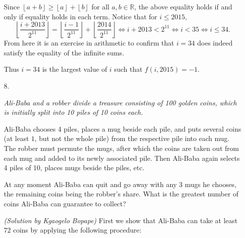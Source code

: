 \documentclass{article}
\begin{document}
\begin{enumerate}
Since $\left\lfloor a + b \right\rfloor \ge \left\lfloor a \right\rfloor + \left\lfloor b \right\rfloor$ for all $a, b \in \mathbb{R}$, the above equality holds if and only if equality holds in each term. Notice that for $i \le 2015$,
\[ \left\lfloor \frac{i + 2013}{2^{11}} \right\rfloor = \left\lfloor \frac{i - 1}{2^{11}} \right\rfloor + \left\lfloor \frac{2014}{2^{11}} \right\rfloor \iff i + 2013 < 2^{11} \iff i < 35 \iff i \le 34. \]
From here it is an exercise in arithmetic to confirm that $i = 34$ does indeed satisfy the equality of the infinite sums.

Thus $i = 34$ is the largest value of $i$ such that $f(i, 2015) = -1$.

\medskip
\item[8.] %
{\itshape Ali-Baba and a robber divide a treasure consisting of 100 golden coins, which is initially split into 10 piles of 10 coins each.

Ali-Baba chooses 4 piles, places a mug beside each pile, and puts several coins (at least $1$, but not the whole pile) from the respective pile into each mug.
The robber must permute the mugs, after which the coins are taken out from each mug and added to its newly associated pile.
Then Ali-Baba again selects 4 piles of 10, places mugs beside the piles, etc.

At any moment Ali-Baba can quit and go away with any 3 mugs he chooses, the remaining coins being the robber's share.
What is the greatest number of coins Ali-Baba can guarantee to collect?}

\textit{(Solution by Kgaogelo Bopape)}
First we show that Ali-Baba can take at least $72$ coins by applying the following
procedure:
	

\end{enumerate}
\end{document}
